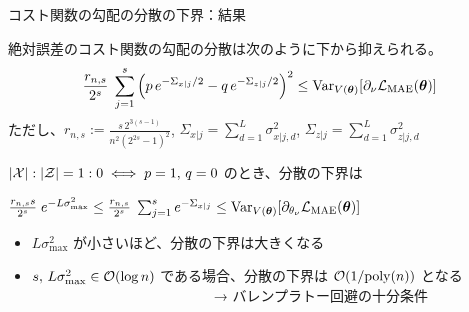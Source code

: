 \documentclass[dvipdfmx,10pt,aspectratio=169]{beamer}
\begin{document}
\begin{frame}{コスト関数の勾配の分散の下界：結果}
    \begin{theorem}
        絶対誤差のコスト関数の勾配の分散は次のように下から抑えられる。
        \begin{align*}
            \frac{r_{n,s}}{2^s}\;
            \sum_{j=1}^s \qty(p\,e^{-\Sigma_{x|j}/2} - q\,e^{-\Sigma_{z|j}/2})^2
            \leq \operatorname{Var}_{V(\vb*{\theta})}[\partial_\nu\mathcal{L}_{\mathrm{MAE}}(\vb*{\theta})]
        \end{align*}
        ただし、$r_{n,s} := \frac{s\,2^{3(s-1)}}{n^2(2^{2s}-1)^2}$, $\Sigma_{x|j} = \sum_{d=1}^L \sigma_{x|j,d}^2$, $\Sigma_{z|j} = \sum_{d=1}^L \sigma_{z|j,d}^2$
    \end{theorem}
    
    $|\mathcal{X}|:|\mathcal{Z}| = 1:0 \iff p = 1,\,q = 0$ のとき、分散の下界は
    
    \begin{center}
        $
            \frac{r_{n,s}s}{2^s}\; e^{-L\sigma_{\max}^2}
            \leq \frac{r_{n,s}}{2^s}\;\sum_{j=1}^s e^{-\Sigma_{x|j}}
            \leq \operatorname{Var}_{V(\vb*{\theta})}[\partial_{\theta_\nu}\mathcal{L}_{\mathrm{MAE}}(\vb*{\theta})]
        $
    \end{center}

    \begin{itemize}
        \item $L\sigma_{\max}^2$ が小さいほど、分散の下界は大きくなる
        \item $s,\,L\sigma_{\max}^2 \in \order{\log{n}}$ である場合、分散の下界は $\order{1/\poly(n)}$ となる\\　　　　　　　　　　　　　→ バレンプラトー回避の十分条件
    \end{itemize}
\end{frame}
\end{document}
